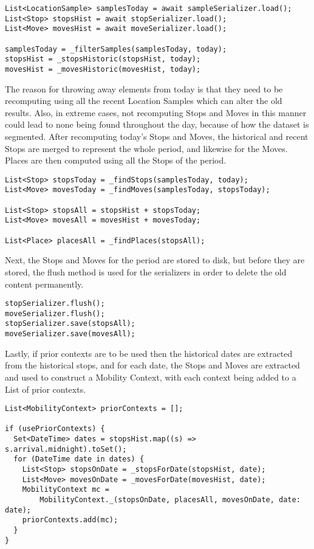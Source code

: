 \begin{verbatim}
List<LocationSample> samplesToday = await sampleSerializer.load();
List<Stop> stopsHist = await stopSerializer.load();
List<Move> movesHist = await moveSerializer.load();

samplesToday = _filterSamples(samplesToday, today);
stopsHist = _stopsHistoric(stopsHist, today);
movesHist = _movesHistoric(movesHist, today);
\end{verbatim}

The reason for throwing away elements from today is that they need to be recomputing using all the recent Location Samples which can alter the old results. Also, in extreme cases, not recomputing Stops and Moves in this manner could lead to none being found throughout the day, because of how the dataset is segmented. After recomputing today's Stops and Moves, the historical and recent Stops are merged to represent the whole period, and likewise for the Moves. Places are then computed using all the Stops of the period.
\begin{verbatim}
List<Stop> stopsToday = _findStops(samplesToday, today);
List<Move> movesToday = _findMoves(samplesToday, stopsToday);

List<Stop> stopsAll = stopsHist + stopsToday;
List<Move> movesAll = movesHist + movesToday;

List<Place> placesAll = _findPlaces(stopsAll);
\end{verbatim}

Next, the Stops and Moves for the period are stored to disk, but before they are stored, the flush method is used for the serializers in order to delete the old content permanently.
\begin{verbatim}
stopSerializer.flush();
moveSerializer.flush();
stopSerializer.save(stopsAll);
moveSerializer.save(movesAll);
\end{verbatim}

Lastly, if prior contexts are to be used then the historical dates are extracted from the historical stops, and for each date, the Stops and Moves are extracted and used to construct a Mobility Context, with each context being added to a List of prior contexts.

\begin{verbatim}
List<MobilityContext> priorContexts = [];

if (usePriorContexts) {
  Set<DateTime> dates = stopsHist.map((s) => s.arrival.midnight).toSet();
  for (DateTime date in dates) {
    List<Stop> stopsOnDate = _stopsForDate(stopsHist, date);
    List<Move> movesOnDate = _movesForDate(movesHist, date);
    MobilityContext mc =
        MobilityContext._(stopsOnDate, placesAll, movesOnDate, date: date);
    priorContexts.add(mc);
  }
}
\end{verbatim}

